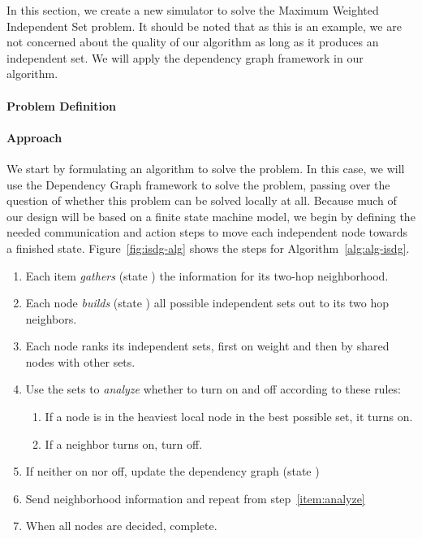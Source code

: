 
\label{sec:sim-new}

In this section, we create a new simulator to solve the Maximum Weighted Independent Set problem. It should be noted that as this is an example, we are not concerned about the quality of our algorithm as long as it produces an independent set. We will apply the dependency graph framework in our algorithm.

\paragraph{Problem Definition}


\paragraph{Approach}
\label{par:approach}
We start by formulating an algorithm to solve the problem. In this case, we will use the Dependency Graph framework to solve the problem, passing over the question of whether this problem can be solved locally at all. Because much of our design will be based on a finite state machine model, we begin by defining the needed communication and action steps to move each independent node towards a finished state. Figure~\ref{fig:isdg-alg} shows the steps for Algorithm~\ref{alg:alg-isdg}.

\begin{enumerate}
\item Each item {\em gathers} (state \cGd) the information for its two-hop neighborhood.
\item Each node {\em builds} (state \cBd) all possible independent sets out to its two hop neighbors.
\item Each node ranks its independent sets, first on weight and then by shared nodes with other sets.
\item Use the sets to {\em analyze} whether to turn on and off according to these rules: \label{item:analyze}
\begin{enumerate}
\item If a node is in the heaviest local node in the best possible set, it turns on.
\item If a neighbor turns on, turn off.
\end{enumerate}
\item If neither on nor off, update the dependency graph (state \cUd) 
\item Send neighborhood information and repeat from step~\ref{item:analyze}
\item When all nodes are decided, complete.
\end{enumerate}

